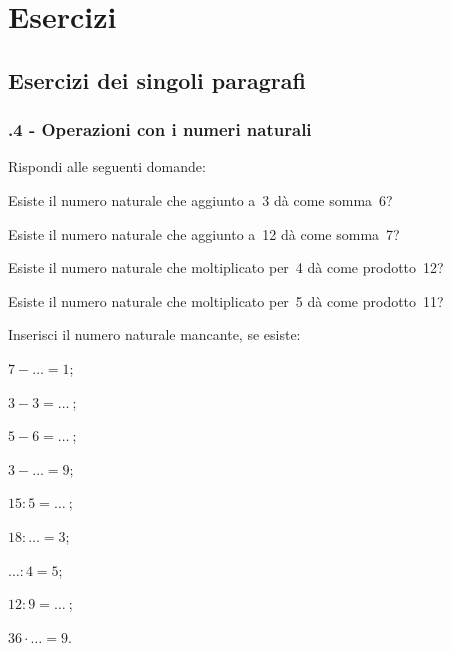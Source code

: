 \section{Esercizi}
\subsection{Esercizi dei singoli paragrafi}
\subsubsection*{\thechapter.4 - Operazioni con i numeri naturali}

\begin{esercizio}
\label{ese:1.1}
Rispondi alle seguenti domande:
 \begin{enumeratea}
 \item Esiste il numero naturale che aggiunto a~3 dà come somma~6?
 \item Esiste il numero naturale che aggiunto a~12 dà come somma~7?
 \item Esiste il numero naturale che moltiplicato per~4 dà come prodotto~12?
 \item Esiste il numero naturale che moltiplicato per~5 dà come prodotto~11?
 \end{enumeratea}
\end{esercizio}

\begin{esercizio}
\label{ese:1.2}
 Inserisci il numero naturale mancante, se esiste:
\begin{multicols}{3}
\begin{enumeratea}
 \item $7-\ldots =1$;
 \item$3-3=\ldots~$;
 \item$5-6=\ldots~$;
 \item $3-\ldots =9$;
 \item$15:5=\ldots~$;
 \item$18:\ldots =3$;
 \item $\ldots:4=5$;
 \item$12:9=\ldots~$;
 \item$36\cdot\ldots =9$.
\end{enumeratea}
\end{multicols}
\end{esercizio}

